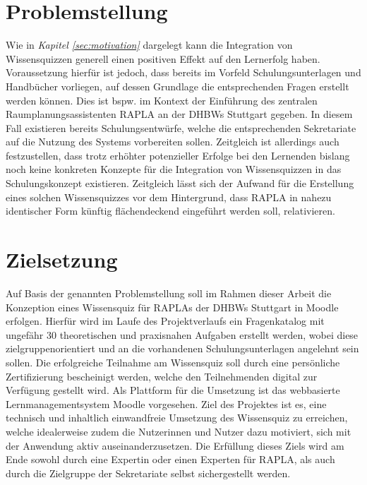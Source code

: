\section{Problemstellung}
Wie in \textit{Kapitel \ref{sec:motivation}} dargelegt kann die Integration von Wissensquizzen
generell einen positiven Effekt auf den Lernerfolg haben. Voraussetzung hierfür ist jedoch, dass
bereits im Vorfeld Schulungsunterlagen und Handbücher vorliegen, auf dessen Grundlage
die entsprechenden Fragen erstellt werden können. Dies ist bspw. im Kontext
der Einführung des zentralen Raumplanungsassistenten \acs{RAPLA} an der \acp{DHBW} Stuttgart
gegeben. In diesem Fall existieren bereits Schulungsentwürfe, welche
die entsprechenden Sekretariate auf die Nutzung des Systems vorbereiten sollen.
Zeitgleich ist allerdings auch festzustellen, dass trotz
erhöhter potenzieller Erfolge bei den Lernenden bislang noch keine
konkreten Konzepte für die Integration von Wissensquizzen in das Schulungskonzept
existieren.
Zeitgleich lässt sich der Aufwand für die Erstellung eines solchen
Wissensquizzes vor dem Hintergrund, dass \ac{RAPLA} in nahezu
identischer Form künftig flächendeckend
eingeführt werden soll, relativieren.


\section{Zielsetzung}\label{sec:zielsetzung}
Auf Basis der genannten Problemstellung soll im Rahmen dieser Arbeit
die Konzeption eines Wissensquiz für \acp{RAPLA} der \acp{DHBW}
Stuttgart in Moodle erfolgen.
Hierfür wird im Laufe des Projektverlaufs ein Fragenkatalog mit ungefähr 30
theoretischen und praxisnahen Aufgaben erstellt werden, wobei diese zielgruppenorientiert
und an die vorhandenen Schulungsunterlagen angelehnt sein sollen.
Die erfolgreiche Teilnahme am Wissensquiz soll durch eine persönliche Zertifizierung
bescheinigt werden, welche den Teilnehmenden digital zur Verfügung gestellt wird.
Als Plattform für die Umsetzung ist das webbasierte Lernmanagementsystem Moodle
vorgesehen.
Ziel des Projektes ist es, eine technisch und inhaltlich einwandfreie Umsetzung
des Wissensquiz zu erreichen, welche idealerweise
zudem die Nutzerinnen und Nutzer dazu motiviert, sich mit der Anwendung aktiv
auseinanderzusetzen.
Die Erfüllung dieses Ziels wird am Ende sowohl durch eine Expertin oder einen
Experten für \ac{RAPLA}, als auch durch die Zielgruppe der Sekretariate selbst
sichergestellt werden.
